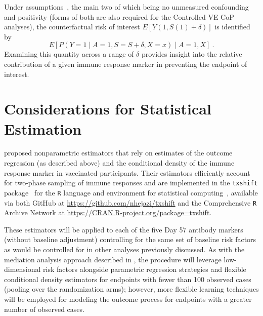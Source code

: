 Under assumptions~\citep{hejazi2020efficient}, the main two of which being no
unmeasured confounding and positivity (forms of both are also required for the
Controlled VE CoP analyses), the counterfactual risk of interest 
$E[Y(1, S(1) + \delta)]$ is identified by
\[
  E[P(Y = 1 \mid A = 1, S = S + \delta, X = x) \mid A = 1, X] \ . 
\]
Examining this quantity across a range of $\delta$ provides insight into the
relative contribution of a given immune response marker in preventing the
endpoint of interest. 

\section{Considerations for Statistical Estimation}

\citet{hejazi2020efficient} proposed nonparametric estimators that rely on
estimates of the outcome regression (as described above) and the conditional
density of the immune response marker in vaccinated participants. Their
estimators efficiently account for two-phase sampling of immune responses and
are implemented in the \texttt{txshift} package~\citep{hejazi2020txshift-joss}
for the \texttt{R} language and environment for statistical computing~\citep{R},
available via both GitHub at \url{https://github.com/nhejazi/txshift} and the
Comprehensive \texttt{R} Archive Network at
\url{https://CRAN.R-project.org/package=txshift}.

These estimators will be applied to each of the five Day 57 antibody markers
(without baseline adjustment) controlling for the same set of baseline risk
factors as would be controlled for in other analyses previously discussed. As
with the mediation analysis approach described in
\citet{benkeser2021inference,gilbert2021covpn}, the procedure will leverage
low-dimensional risk factors alongside parametric regression strategies and
flexible conditional density estimators for endpoints with fewer than 100
observed cases (pooling over the randomization arms); however, more flexible
learning techniques will be employed for modeling the outcome process for
endpoints with a greater number of observed cases.

